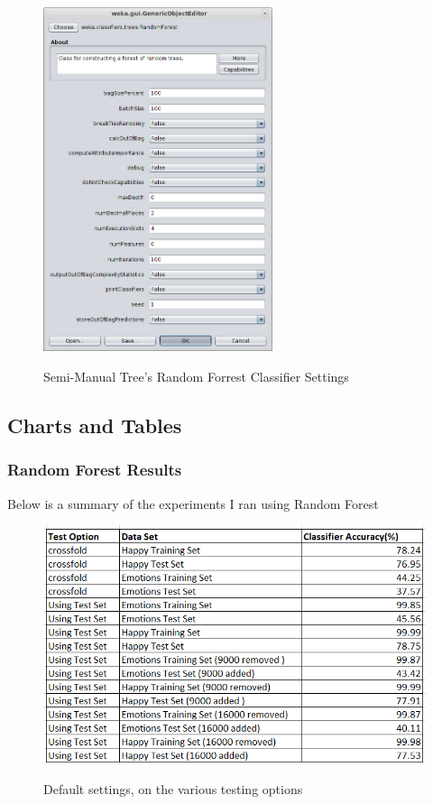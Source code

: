 \begin{figure}[!htb]
	\centering
\includegraphics[width=0.6\textwidth]{imgs/userClassifier/noSplit/all/Train-and-Test/tree_classifier.png} \\
	\caption{Semi-Manual Tree's Random Forrest Classifier Settings}
	\label{fig:appendix:classifier:rfucs}
\end{figure}


\FloatBarrier
\subsection{Charts and Tables}
\label{sec:appendix:charts_tables}

\FloatBarrier
\subsubsection{Random Forest Results}
Below is a summary of the experiments I ran using Random Forest
\begin{figure}[hbt!]
	\centering
      \includegraphics[width=\textwidth]{imgs/RandomForest/RandomForest_Main.png} \\
	\caption{Default settings, on the various testing options}
	\label{fig:randomforest_main}
\end{figure}

